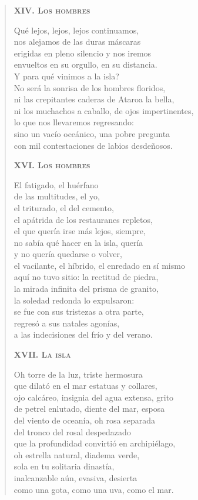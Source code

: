 \documentclass[12pt]{article}
\begin{document}
\begin{verse}
{\bfseries\scshape {XIV. Los hombres}}

Qué lejos, lejos, lejos continuamos,\\
nos alejamos de las duras máscaras\\
erigidas en pleno silencio y nos iremos\\
envueltos en su orgullo, en su distancia.\\
Y para qué vinimos a la isla?\\
No será la sonrisa de los hombres floridos,\\
ni las crepitantes caderas de Ataroa la bella,\\
ni los muchachos a caballo, de ojos impertinentes,\\
lo que nos llevaremos regresando:\\
sino un vacío oceánico, una pobre pregunta\\
con mil contestaciones de labios desdeñosos.  

{\bfseries\scshape {XVI. Los hombres}}

El fatigado, el huérfano\\
de las multitudes, el yo,\\
el triturado, el del cemento,\\
el apátrida de los restauranes repletos,\\
el que quería irse más lejos, siempre,\\
no sabía qué hacer en la isla, quería\\
y no quería quedarse o volver,\\
el vacilante, el híbrido, el enredado en sí mismo\\
aquí no tuvo sitio: la rectitud de piedra,\\
la mirada infinita del prisma de granito,\\
la soledad redonda lo expulsaron:\\
se fue con sus tristezas a otra parte,\\
regresó a sus natales agonías,\\
a las indecisiones del frío y del verano.  

{\bfseries\scshape {XVII. La isla}}

Oh torre de la luz, triste hermosura\\
que dilató en el mar estatuas y collares,\\
ojo calcáreo, insignia del agua extensa, grito\\
de petrel enlutado, diente del mar, esposa\\
del viento de oceanía, oh rosa separada\\
del tronco del rosal despedazado\\
que la profundidad convirtió en archipiélago,\\
oh estrella natural, diadema verde,\\
sola en tu solitaria dinastía,\\
inalcanzable aún, evasiva, desierta\\
como una gota, como una uva, como el mar.  


\end{verse}
\end{document}
